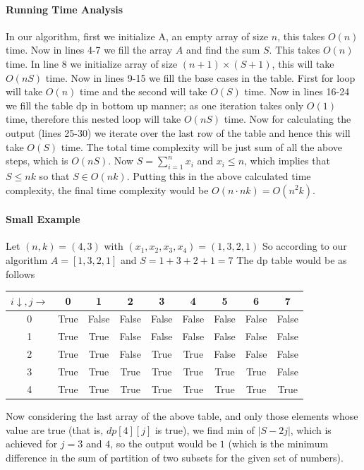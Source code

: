 \documentclass[answers]{exam}
\begin{document}
\begin{questions}
\begin{solution}
\paragraph{Running Time Analysis}
In our algorithm, first we initialize A, an empty array of size $n$, this takes $O(n)$ time. Now in lines 4-7 we fill the array $A$ and find the sum $S$. This takes $O(n)$ time. In line 8 we initialize array of size $(n+1) \times (S+1)$, this will take $O(nS)$ time. Now in lines 9-15 we fill the base cases in the table. First for loop will take $O(n)$ time and the second will take $O(S)$ time. Now in lines 16-24 we fill the table dp in bottom up manner; as one iteration takes only $O(1)$ time, therefore this nested loop will take $O(nS)$ time. Now for calculating the output (lines 25-30) we iterate over the last row of the table and hence this will take $O(S)$ time. 
\newline The total time complexity will be just sum of all the above steps, which is $O(nS)$.
\newline Now $S=\sum_{i=1}^{n}x_i$ and $x_{i}\leq n$, which implies that $S\leq nk$ so that $S \in O(nk)$. Putting this in the above calculated time complexity, the final time complexity would be $O(n \cdot nk) = O(n^2 k)$. 
\paragraph{Small Example}
Let $(n,k)=(4,3)$ with $(x_1,x_2,x_3,x_4)=(1,3,2,1)$
\newline So according to our algorithm $A=[1,3,2,1]$ and $S=1+3+2+1=7$
\newline The dp table would be as follows
\begin{center}
        \begin{tabular}{|c|c|c|c|c|c|c|c|c|}
            \hline
            $i \downarrow, j \rightarrow$ & 0 & 1 & 2 & 3 & 4 & 5 & 6 & 7\\
            \hline
            0 & True & False & False & False & False & False &False &False  \\
            \hline
            1 &  True &True & False & False & False & False & False &False\\
            \hline
            2 &  True & True & False & True & True & False & False  &False\\
            \hline
            3 &  True & True & True & True & True & True & True &False\\
            \hline
            4 &  True & True & True & True & True & True & True &True\\
            \hline
        \end{tabular}
    \end{center}
Now considering the last array of the above table, and only those elements whose value are true (that is, $dp[4][j]$ is true), we find min of $|S-2j|$, which is achieved for $j=3$ and $4$, so the output would be $1$ (which is the minimum difference in the sum of partition of two subsets for the given set of numbers).
\end{solution}





\end{questions}
\end{document}
